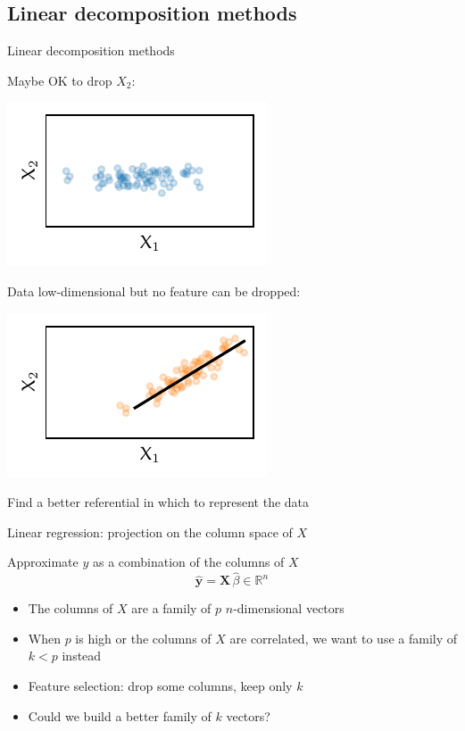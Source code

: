 \documentclass[presentation,mathserif,table]{beamer}
\newcommand{\X}{{\mathbold X}}
\newcommand{\y}{{\mathbold y}}
\newcommand{\R}{\mathbb{R}}
\begin{document}
\subsection{Linear decomposition methods}
\label{sec:org5658fcc}
\begin{frame}[label={sec:orgbc12549}]{Linear decomposition methods}
\begin{block}{Maybe OK to drop \(X_2\):}
\vspace{-10pt}
\begin{center}
\includegraphics[height=.3\textheight]{figures/generated/pca/cloud_aligned.pdf}
\end{center}
\vspace{-20pt}
\end{block}
\begin{block}{Data low-dimensional but no feature can be dropped:}
\begin{center}
\includegraphics[height=.3\textheight]{figures/generated/pca/cloud_not_aligned.pdf}
\end{center}

Find a better referential in which to represent the data
\end{block}
\end{frame}
\begin{frame}[label={sec:org0c683d0}]{Linear regression: projection on the column space of \(X\)}
\begin{block}{Approximate \(y\) as a combination of the columns of \(X\)}
\begin{equation}
\hat{\y} = \X \, \hat{\beta} \in \R^n
\end{equation}
\begin{itemize}
\item The columns of \(X\) are a family of \(p\) \(n\)-dimensional vectors
\item When \(p\) is high or the columns of \(X\) are correlated, we want to use a family of \(k < p\) instead
\item Feature selection: drop some columns, keep only \(k\)
\item Could we build a better family of \(k\) vectors?
\end{itemize}
\end{block}
\end{frame}
\end{document}
